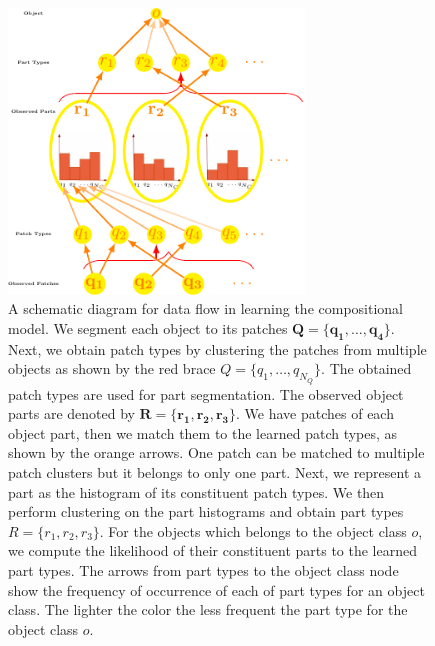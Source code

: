 \documentclass[a4paper,11pt,pdf]{pacmanreport}
\begin{document}
\begin{figure}[h!]
\begin{center}
\includegraphics[width=0.7\textwidth,height=0.4\textheight]{rel3.pdf}
\end{center}
\caption{A schematic diagram for data flow in learning the compositional model. We segment each object to its patches $\mathbf{Q}=\{\mathbf{q_1},\ldots,\mathbf{q_4}\}$. Next, we obtain patch types by clustering the patches from multiple objects as shown by the red brace $Q=\{q_1,\ldots,q_{N_{Q}}\}$. The obtained patch types are used for part segmentation. The observed object parts are denoted by $\mathbf{R}=\{\mathbf{r_1},\mathbf{r_2},\mathbf{r_3}\}$. We have patches of each object part, then we match them to the learned patch types, as shown by the orange arrows. One patch can be matched to multiple patch clusters but it belongs to only one part. Next, we represent a part as the histogram of its constituent patch types. We then perform clustering on the part histograms and obtain part types $R=\{r_1,r_2,r_3\}$. For the objects which belongs to the object class $o$, we compute the likelihood of their constituent parts to the learned part types. The arrows from part types to the object class node show the frequency of occurrence of each of part types for an object class. The lighter the color the less frequent the part type for the object class $o$.} 
\label{fig:rel2}
\end{figure}
\end{document}
